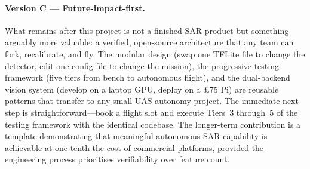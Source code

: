 \paragraph{{\color{olive} Version C --- Future-impact-first.}}
What remains after this project is not a finished SAR product but something arguably more valuable: a verified, open-source architecture that any team can fork, recalibrate, and fly. The modular design (swap one TFLite file to change the detector, edit one config file to change the mission), the progressive testing framework (five tiers from bench to autonomous flight), and the dual-backend vision system (develop on a laptop GPU, deploy on a \pounds75 Pi) are reusable patterns that transfer to any small-UAS autonomy project. The immediate next step is straightforward---book a flight slot and execute Tiers~3 through~5 of the testing framework with the identical codebase. The longer-term contribution is a template demonstrating that meaningful autonomous SAR capability is achievable at one-tenth the cost of commercial platforms, provided the engineering process prioritises verifiability over feature count.


